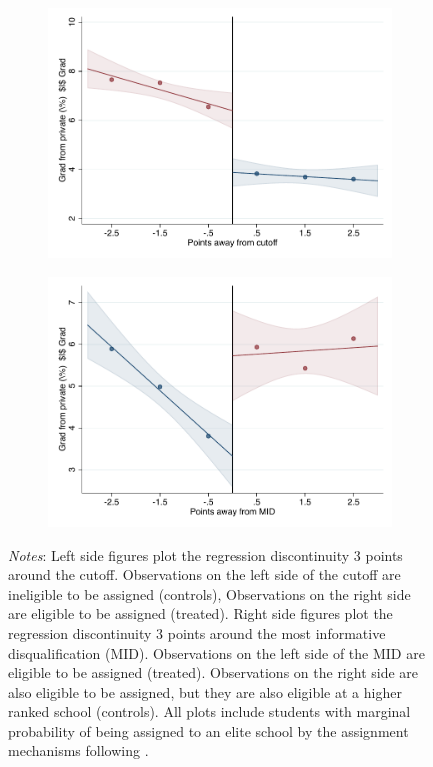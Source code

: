 \documentclass[oneside,11pt]{article}
\begin{document}
\begin{figure}[H]
\begin{center}
    \begin{subfigure}{0.475\textwidth}
        \centering
        \includegraphics[width=\textwidth]{04_Figures/rd_plot_tau_ENLACE_Privado_IPN3.pdf}
    \end{subfigure}
    \begin{subfigure}{0.475\textwidth}
        \centering
        \includegraphics[width=\textwidth]{04_Figures/rd_plot_mid_ENLACE_Privado_IPN3.pdf}
    \end{subfigure}
    \end{center}
    
\footnotesize
\textit{Notes}: Left side figures plot the regression discontinuity 3 points around the cutoff. Observations on the left side of the cutoff are ineligible to be assigned (controls), Observations on the right side are eligible to be assigned (treated). Right side figures plot the regression discontinuity 3 points around the most informative disqualification (MID). Observations on the left side of the MID are eligible to be assigned (treated). Observations on the right side are also eligible to be assigned, but they are also eligible at a higher ranked school (controls). All plots include students with marginal probability of being assigned to an elite school by the assignment mechanisms following \citet{abdulkadirouglu2022breaking}. 
\end{figure}
\end{document}
